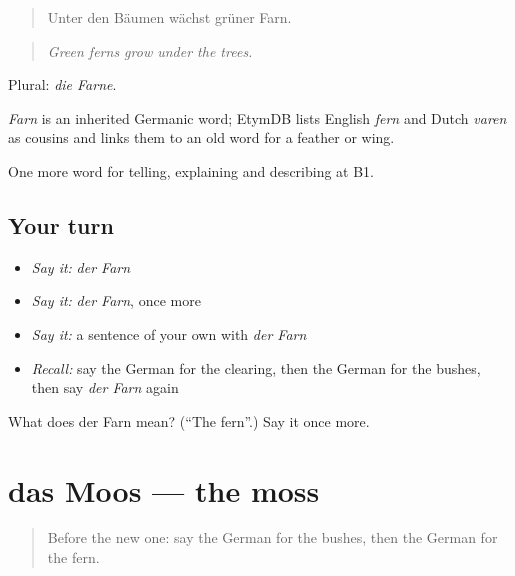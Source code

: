 \begin{quote}
Unter den Bäumen wächst grüner Farn.
\end{quote}

\begin{quote}
\emph{Green ferns grow under the trees.}
\end{quote}

Plural: \emph{die Farne}.

\begin{cousinweb}
\emph{Farn} is an inherited Germanic word; EtymDB lists English \emph{fern} and Dutch \emph{varen} as cousins and links them to an old word for a feather or wing.
\end{cousinweb}

\begin{grammarlens}[title={What you've built}]
One more word for telling, explaining and describing at B1.
\end{grammarlens}

\subsection*{Your turn}
\begin{itemize}
\raggedright
  \item \emph{Say it:} \emph{der Farn}
  \item \emph{Say it:} \emph{der Farn}, once more
  \item \emph{Say it:} a sentence of your own with \emph{der Farn}
  \item \emph{Recall:} say the German for the clearing, then the German for the bushes, then say \emph{der Farn} again
\end{itemize}

\begin{tcolorbox}[breakable,colback=teal!4,colframe=teal!35!black,title={Before you move on}]
What does der Farn mean? (\textquotedblleft{}The fern\textquotedblright{}.) Say it once more.
\end{tcolorbox}
\section[das Moos]{das Moos — the moss}

\label{lesson:GE-C456-moos}



\begin{quote}
Before the new one: say the German for the bushes, then the German for the fern.
\end{quote}

